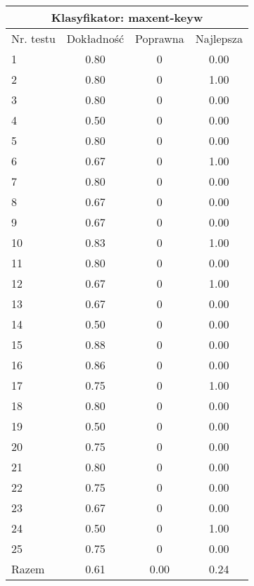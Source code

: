 \begin{tabular}{|l|c|c|c|}
\hline
\multicolumn{4}{|c|}{Klasyfikator: maxent-keyw}\\
\hline
Nr. testu & Dokładność & Poprawna & Najlepsza\\
\hline
1 & 0.80 & 0 & 0.00 \\
2 & 0.80 & 0 & 1.00 \\
3 & 0.80 & 0 & 0.00 \\
4 & 0.50 & 0 & 0.00 \\
5 & 0.80 & 0 & 0.00 \\
6 & 0.67 & 0 & 1.00 \\
7 & 0.80 & 0 & 0.00 \\
8 & 0.67 & 0 & 0.00 \\
9 & 0.67 & 0 & 0.00 \\
10 & 0.83 & 0 & 1.00 \\
11 & 0.80 & 0 & 0.00 \\
12 & 0.67 & 0 & 1.00 \\
13 & 0.67 & 0 & 0.00 \\
14 & 0.50 & 0 & 0.00 \\
15 & 0.88 & 0 & 0.00 \\
16 & 0.86 & 0 & 0.00 \\
17 & 0.75 & 0 & 1.00 \\
18 & 0.80 & 0 & 0.00 \\
19 & 0.50 & 0 & 0.00 \\
20 & 0.75 & 0 & 0.00 \\
21 & 0.80 & 0 & 0.00 \\
22 & 0.75 & 0 & 0.00 \\
23 & 0.67 & 0 & 0.00 \\
24 & 0.50 & 0 & 1.00 \\
25 & 0.75 & 0 & 0.00 \\
\hline
Razem & 0.61 & 0.00 & 0.24 \\
\hline
\end{tabular}
